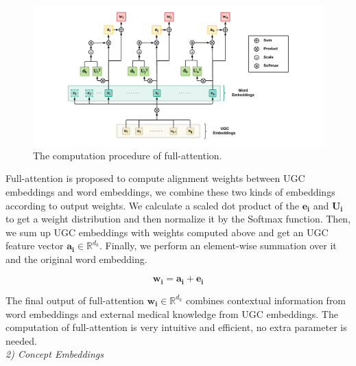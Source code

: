 \documentclass[conference]{IEEEtran}
\begin{document}
\begin{figure}[ht]
	\centering
	\includegraphics[scale=0.85]{figures/full-attention}
	\caption{The computation procedure of full-attention.}
	\label{fig:full-attention}
\end{figure}

Full-attention is proposed to compute alignment weights between UGC embeddings and word embeddings,
we combine these two kinds of embeddings according to output weights.
We calculate a scaled dot product of the $\bm{e_i}$ and $\bm{U_i}$ to get a weight distribution
and then normalize it by the Softmax function.
Then, we sum up UGC embeddings with weights computed above
and get an UGC feature vector $\bm{a_i} \in \mathbb{R}^{d_k}$.
Finally, we perform an element-wise summation over it and the original word embedding.

\begin{equation}
\bm{w_i} = \bm{a_i} + \bm{e_i}
\end{equation}

The final output of full-attention $\bm{w_i} \in \mathbb{R}^{d_k}$ combines contextual information from word 
embeddings and external medical knowledge from UGC embeddings.
The computation of full-attention is very intuitive and efficient, no extra parameter is needed.\\

\emph{2) Concept Embeddings}

\bigbreak
\end{document}
